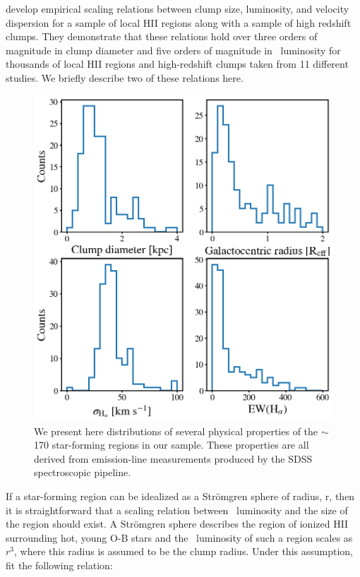 \cite{Wisnioski2012} develop empirical scaling relations between clump size, luminosity, and velocity dispersion for a sample of local HII regions along with a sample of high redshift clumps. They demonstrate that these relations hold over three orders of magnitude in clump diameter and five orders of magnitude in \ha~luminosity for thousands of local HII regions and high-redshift clumps taken from 11 different studies. We briefly describe two of these relations here. 


\begin{figure}
\centering
\includegraphics[width=5in]{Figures/clump_4properties.png}
\caption[Histogram distributions of several physical properties for $\sim$170 ``clumps.'']{We present here distributions of several physical properties of the $\sim$170 star-forming regions in our sample. These properties are all derived from emission-line measurements produced by the SDSS spectroscopic pipeline. }
\label{fig: clump histograms}
\end{figure}

If a star-forming region can be idealized as a Str{\"o}mgren sphere of radius, r, then it is straightforward that a scaling relation between \ha~luminosity and the size of the region should exist. A Str{\"o}mgren sphere describes the region of ionized HII surrounding hot, young O-B stars and the \ha~luminosity of such a region scales as $r^3$, where this radius is assumed to be the clump radius. Under this assumption, \citep{Wisnioski2012} fit the following relation:

